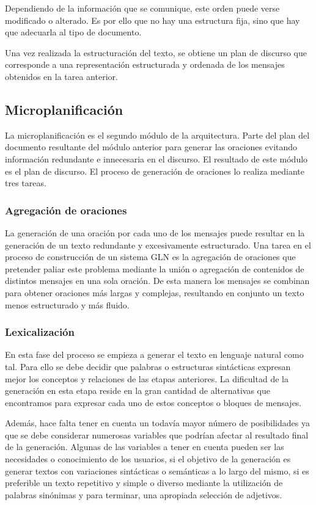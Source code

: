 Dependiendo de la información que se comunique, este orden puede verse modificado o alterado. Es por ello que no hay una estructura fija, sino que hay que adecuarla al tipo de documento.

Una vez realizada la estructuración del texto, se obtiene un plan de discurso que corresponde a una representación estructurada y ordenada de los mensajes obtenidos en la tarea anterior.

\subsection{Microplanificación}
La microplanificación es el segundo módulo de la arquitectura. Parte del plan del documento resultante del módulo anterior para generar las oraciones evitando información redundante e innecesaria en el discurso. El resultado de este módulo es el plan de discurso. El proceso de generación de oraciones lo realiza mediante tres tareas.

\subsubsection{Agregación de oraciones}
La generación de una oración por cada uno de los mensajes puede resultar en la generación de un texto redundante y excesivamente estructurado. Una tarea en el proceso de construcción de un sistema GLN es la agregación de oraciones que pretender paliar este problema mediante la unión o agregación de contenidos de distintos mensajes en una sola oración. De esta manera los mensajes se combinan para obtener oraciones más largas y complejas, resultando en conjunto un texto menos estructurado y más fluido.

\subsubsection{Lexicalización}
En esta fase del proceso se empieza a generar el texto en lenguaje natural como tal. Para ello se debe decidir que palabras o estructuras sintácticas expresan mejor los conceptos y relaciones de las etapas anteriores. La dificultad de la generación en esta etapa reside en la gran cantidad de alternativas que encontramos para  expresar cada uno de estos conceptos o bloques de mensajes. 

Además, hace falta tener en cuenta un todavía mayor número de posibilidades ya que se debe considerar numerosas variables que podrían afectar al resultado final de la generación. Algunas de las variables a tener en cuenta pueden ser las necesidades o conocimiento de los usuarios, si el objetivo de la generación es generar textos con variaciones sintácticas o semánticas a lo largo del mismo, si es preferible un texto repetitivo y simple o diverso mediante la utilización de palabras sinónimas y para terminar, una apropiada selección de adjetivos.


